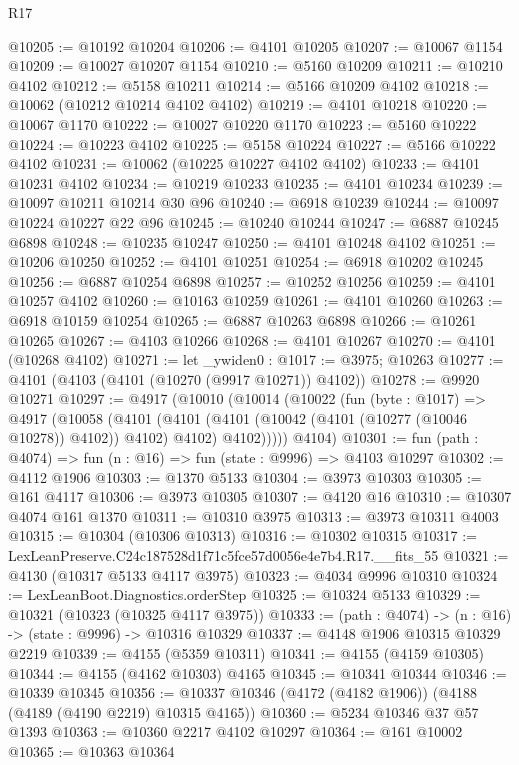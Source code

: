 \begin{lexlean}{R17}
\begin{coremodule}
@10205 := @10192 @10204
@10206 := @4101 @10205
@10207 := @10067 @1154
@10209 := @10027 @10207 @1154
@10210 := @5160 @10209
@10211 := @10210 @4102
@10212 := @5158 @10211
@10214 := @5166 @10209 @4102
@10218 := @10062 (@10212 @10214 @4102 @4102)
@10219 := @4101 @10218
@10220 := @10067 @1170
@10222 := @10027 @10220 @1170
@10223 := @5160 @10222
@10224 := @10223 @4102
@10225 := @5158 @10224
@10227 := @5166 @10222 @4102
@10231 := @10062 (@10225 @10227 @4102 @4102)
@10233 := @4101 @10231 @4102
@10234 := @10219 @10233
@10235 := @4101 @10234
@10239 := @10097 @10211 @10214 @30 @96
@10240 := @6918 @10239
@10244 := @10097 @10224 @10227 @22 @96
@10245 := @10240 @10244
@10247 := @6887 @10245 @6898
@10248 := @10235 @10247
@10250 := @4101 @10248 @4102
@10251 := @10206 @10250
@10252 := @4101 @10251
@10254 := @6918 @10202 @10245
@10256 := @6887 @10254 @6898
@10257 := @10252 @10256
@10259 := @4101 @10257 @4102
@10260 := @10163 @10259
@10261 := @4101 @10260
@10263 := @6918 @10159 @10254
@10265 := @6887 @10263 @6898
@10266 := @10261 @10265
@10267 := @4103 @10266
@10268 := @4101 @10267
@10270 := @4101 (@10268 @4102)
@10271 := let _ywiden0 : @1017 := @3975; @10263
@10277 := @4101 (@4103 (@4101 (@10270 (@9917 @10271)) @4102))
@10278 := @9920 @10271
@10297 := @4917
    (@10010
      (@10014
        (@10022
          (fun (byte : @1017) =>
          @4917
            (@10058
              (@4101
                (@4101 (@4101 (@10042 (@4101 (@10277 (@10046 @10278)) @4102)) @4102) @4102)
                @4102)))))
      @4104)
@10301 := fun (path : @4074) => fun (n : @16) => fun (state : @9996) => @4103 @10297
@10302 := @4112 @1906
@10303 := @1370 @5133
@10304 := @3973 @10303
@10305 := @161 @4117
@10306 := @3973 @10305
@10307 := @4120 @16
@10310 := @10307 @4074 @161 @1370
@10311 := @10310 @3975
@10313 := @3973 @10311 @4003
@10315 := @10304 (@10306 @10313)
@10316 := @10302 @10315
@10317 := LexLeanPreserve.C24c187528d1f71c5fce57d0056e4e7b4.R17.__fits_55
@10321 := @4130 (@10317 @5133 @4117 @3975)
@10323 := @4034 @9996 @10310
@10324 := LexLeanBoot.Diagnostics.orderStep
@10325 := @10324 @5133
@10329 := @10321 (@10323 (@10325 @4117 @3975))
@10333 := (path : @4074) -> (n : @16) -> (state : @9996) -> @10316 @10329
@10337 := @4148 @1906 @10315 @10329 @2219
@10339 := @4155 (@5359 @10311)
@10341 := @4155 (@4159 @10305)
@10344 := @4155 (@4162 @10303) @4165
@10345 := @10341 @10344
@10346 := @10339 @10345
@10356 := @10337 @10346 (@4172 (@4182 @1906)) (@4188 (@4189 (@4190 @2219) @10315 @4165))
@10360 := @5234 @10346 @37 @57 @1393
@10363 := @10360 @2217 @4102 @10297
@10364 := @161 @10002
@10365 := @10363 @10364

\end{coremodule}
\end{lexlean}
